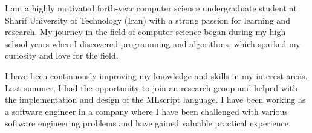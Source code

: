 

\begin{cvparagraph}

I am a highly motivated forth-year computer science undergraduate student at Sharif University of Technology (Iran) with a strong passion for learning and research. My journey in the field of computer science began during my high school years when I discovered programming and algorithms, which sparked my curiosity and love for the field.

I have been continuously improving my knowledge and skills in my interest areas. Last summer, I had the opportunity to join an research group and helped with the implementation and design of the MLscript language.  I have been working as a software engineer in a company where I have been challenged with various software engineering problems and have gained valuable practical experience.


\end{cvparagraph}